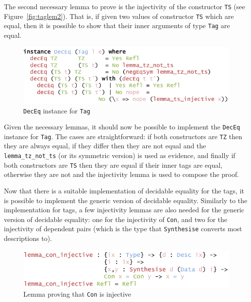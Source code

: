 \documentclass{ituthesis}
\newcommand{\ttconstructor}[1]{\textcolor{constructor-color}{\texttt{#1}}}
\newcommand{\tttype}[1]{\textcolor{type-color}{\texttt{#1}}}
\newcommand{\ttdec}[1]{\textcolor{declared-var-color}{\texttt{#1}}}
\theoremstyle{break}
\begin{document}
The second necessary lemma to prove is the injectivity of the constructor \ttconstructor{TS} (see Figure~\ref{fig:taglem2}).
That is, if given two values of constructor \ttconstructor{TS} which are equal, then it is possible to show that their inner arguments of type \tttype{Tag} are equal.

\begin{figure}[ht]
\begin{center}
    \includegraphics[scale=0.5]{Figures/TagDecEqLemmaInstance.png}
\end{center}
\caption{\tttype{DecEq} instance for \tttype{Tag}}
\label{fig:tagdeceqinst}
\end{figure}

Given the necessary lemmas, it should now be possible to implement the \tttype{DecEq} instance for \tttype{Tag}.
The cases are straightforward: if both constructors are \ttconstructor{TZ} then they are always equal, if they differ then they are not equal
and the \ttdec{lemma\_tz\_not\_ts} (or its symmetric version) is used as evidence, and finally if both constructors are \ttconstructor{TS} then they are equal
if their inner tags are equal, otherwise they are not and the injectivity lemma is used to compose the proof.

Now that there is a suitable implementation of decidable equality for the tags, it is possible to implement the generic version of decidable equality.
Similarly to the implementation for tags, a few injectivity lemmas are also needed for the generic version of decidable equality: 
one for the injectivity of \ttconstructor{Con}, and two for the injectivity of dependent pairs (which is the type that \ttdec{Synthesise} converts most descriptions to).

\begin{figure}[ht]
\begin{center}
    \includegraphics[scale=0.5]{Figures/GenericDecEqLemma1.png}
\end{center}
\caption{Lemma proving that \ttconstructor{Con} is injective}
\label{fig:dglem1}
\end{figure}
\end{document}
